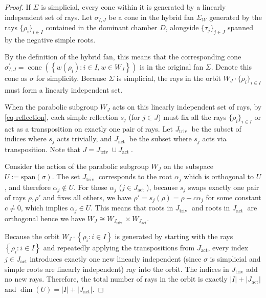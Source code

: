 \documentclass{amsart}
\theoremstyle{definition}
\theoremstyle{remark}
\numberwithin{equation}{section}
\begin{document}
\begin{proof}
If $\Sigma$ is simplicial, every cone within it is generated by a linearly independent set of rays. 
Let $\sigma_{I, J}$ be a cone in the hybrid fan $\Sigma_W$ generated by the rays $\{\rho_i\}_{i \in I}$ contained in the dominant chamber $D$, alongside $\{\tau_j\}_{j \in J}$ spanned by the negative simple roots.

By the definition of the hybrid fan, this means that the corresponding cone $\sigma_{I, J}^{\prime}=\operatorname{cone}\left(\left\{w\left(\rho_i\right): i \in I, w \in W_J\right\}\right)$ is in the original fan $\Sigma$. Denote this cone as $\sigma$ for simplicity. Because $\Sigma$ is simplicial, the rays in the orbit $W_J \cdot \{\rho_i\}_{i \in I}$ must form a linearly independent set. 

When the parabolic subgroup $W_J$ acts on this linearly independent set of rays, by \eqref{eq-reflection}, each simple reflection $s_j$ (for $j \in J$) must fix all the rays $\{\rho_i\}_{i \in I}$ or act as a transposition on exactly one pair of rays. Let $J_{\text {triv }}$ be the subset of indices where $s_j$ acts trivially, and $J_{\text {act }}$ be the subset where $s_j$ acts via transposition. Note that $J=J_{\text {triv }} \cup J_{\text {act }}$. 

Consider the action of the parabolic subgroup $W_J$ on the subspace $U := \text{span}(\sigma)$.  The set $J_{\text {triv }}$ corresponds to the root $\alpha_j$ which is orthogonal to $U$, and therefore $\alpha_j \notin U$. For those $\alpha_j$ ($j \in J_{\text {act }}$), because $s_j$ swaps exactly one pair of rays $\rho, \rho'$ and fixes all others, we have 
$\rho' = s_j(\rho) = \rho - c \alpha_j$ for some constant $c \neq 0$, which implies $\alpha_j \in U$. This means that roots in $J_{\text {triv }}$ and roots in $J_{\text {act }}$ are orthogonal hence we have $W_J\cong W_{J_{\text{triv }}}\times W_{J_{\text {act}}}$.

Because the orbit $W_J \cdot \left\{\rho_i: i \in I\right\}$ is generated by starting with the rays $\left\{\rho_i: i \in I\right\}$ and repeatedly applying the transpositions from $J_{\text{act}}$, every index $j \in J_{\text{act}}$ introduces exactly one new linearly independent (since $\sigma$ is simplicial and simple roots are linearly independent) ray into the orbit. The indices in $J_{\text{triv}}$ add no new rays.
Therefore, the total number of rays in the orbit is exactly
$|I| + |J_{\text{act}}|$ and $\dim(U) = |I| + |J_{\text{act}}|$.


\end{proof}
\end{document}
